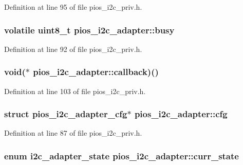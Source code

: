 \-Definition at line 95 of file pios\-\_\-i2c\-\_\-priv.\-h.

\hypertarget{structpios__i2c__adapter_a25823130023ae773a53a858647b65fbb}{
\subsubsection[{busy}]{\setlength{\rightskip}{0pt plus 5cm}volatile uint8\-\_\-t {\bf pios\-\_\-i2c\-\_\-adapter\-::busy}}}\label{structpios__i2c__adapter_a25823130023ae773a53a858647b65fbb}


\-Definition at line 92 of file pios\-\_\-i2c\-\_\-priv.\-h.

\hypertarget{structpios__i2c__adapter_abe4e844b2ffcd0984dc55c8985bd0401}{
\subsubsection[{callback}]{\setlength{\rightskip}{0pt plus 5cm}void($\ast$ {\bf pios\-\_\-i2c\-\_\-adapter\-::callback})()}}\label{structpios__i2c__adapter_abe4e844b2ffcd0984dc55c8985bd0401}


\-Definition at line 103 of file pios\-\_\-i2c\-\_\-priv.\-h.

\hypertarget{structpios__i2c__adapter_a99a6a40ff53546cd3f5a316a621be402}{
\subsubsection[{cfg}]{\setlength{\rightskip}{0pt plus 5cm}struct {\bf pios\-\_\-i2c\-\_\-adapter\-\_\-cfg}$\ast$ {\bf pios\-\_\-i2c\-\_\-adapter\-::cfg}}}\label{structpios__i2c__adapter_a99a6a40ff53546cd3f5a316a621be402}


\-Definition at line 87 of file pios\-\_\-i2c\-\_\-priv.\-h.

\hypertarget{structpios__i2c__adapter_ac619064c9dc42d3057f2188f188d5ee3}{
\subsubsection[{curr\-\_\-state}]{\setlength{\rightskip}{0pt plus 5cm}enum {\bf i2c\-\_\-adapter\-\_\-state} {\bf pios\-\_\-i2c\-\_\-adapter\-::curr\-\_\-state}}}\label{structpios__i2c__adapter_ac619064c9dc42d3057f2188f188d5ee3}


